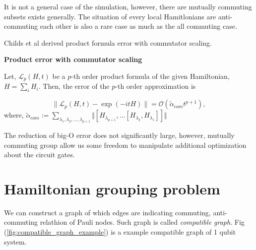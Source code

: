 It is not a general case of the simulation, however, there are mutually commuting subsets exists generally.
The situation of every local Hamitlonians are anti-commuting each other is also a rare case as much as the all commuting case.

Childs et al derived product formula error with commutator scaling\cite{PhysRevX.11.011020}.

\begin{theorem}\textbf{Product error with commutator scaling}
    
    Let, $\mathcal{L}_p(H, t)$ be a $p$-th order product formula of the given Hamiltonian, $H = \sum_i H_i$.
    Then, the error of the $p$-th order approximation is 

    \begin{equation}
        \| \mathcal{L}_p(H ,t) - \exp(-i t H) \| = \mathcal{O}(\tilde{\alpha}_{com} t^{p+1}),
    \end{equation}
    where, $\tilde{\alpha}_{com} := \sum_{\lambda_1, \lambda_2, \dots , \lambda_{p+1}} \Vert[H_{\lambda_{p+1}}, \dots [H_{\lambda_2}, H_{\lambda_1}]] \Vert$
    
\end{theorem}

The reduction of big-O error does not significantly large, however, mutually commuting group allow us some freedom to manipulate additional optimization about the circuit gates.

\section{Hamiltonian grouping problem}

We can construct a graph of which edges are indicating commuting, anti-commuting relathion of Pauli nodes.
Such graph is called \textit{compatible graph}. 
Fig (\ref{fig:compatible_graph_example}) is a example compatible graph of 1 qubit system.

